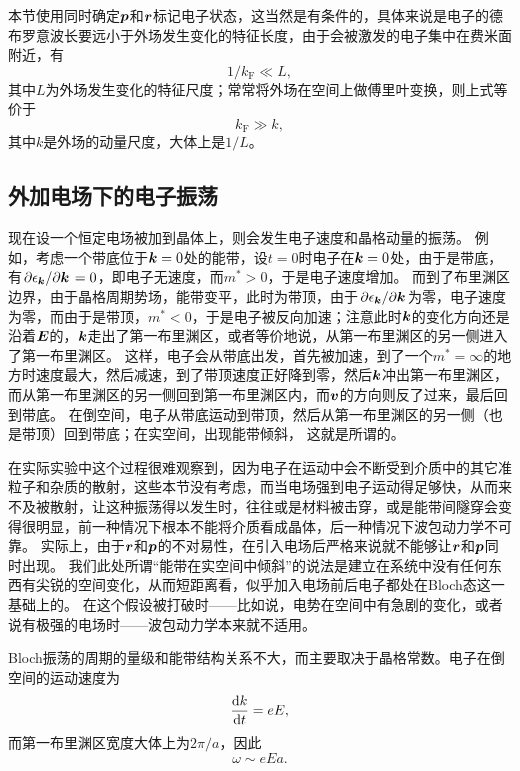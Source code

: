 本节使用同时确定$\vb*{p}$和$\vb*{r}$标记电子状态，这当然是有条件的，具体来说是电子的德布罗意波长要远小于外场发生变化的特征长度，由于会被激发的电子集中在费米面附近，有
\begin{equation}
    1 / k_\text{F} \ll L,
\end{equation}
其中$L$为外场发生变化的特征尺度；常常将外场在空间上做傅里叶变换，则上式等价于
\begin{equation}
    k_\text{F} \gg k,
\end{equation}
其中$k$是外场的动量尺度，大体上是$1/L$。

\subsection{外加电场下的电子振荡}

现在设一个恒定电场被加到晶体上，则会发生电子速度和晶格动量的振荡。
例如，考虑一个带底位于$\vb*{k}=0$处的能带，设$t=0$时电子在$\vb*{k}=0$处，由于是带底，有$\pdv*{\epsilon_{\vb*{k}}}{\vb*{k}} = 0$，即电子无速度，而$m^* > 0$，于是电子速度增加。
而到了布里渊区边界，由于晶格周期势场，能带变平，此时为带顶，由于$\pdv*{\epsilon_{\vb*{k}}}{\vb*{k}}$为零，电子速度为零，而由于是带顶，$m^* < 0$，于是电子被反向加速；注意此时$\vb*{k}$的变化方向还是沿着$\vb*{E}$的，$\vb*{k}$走出了第一布里渊区，或者等价地说，从第一布里渊区的另一侧进入了第一布里渊区。
这样，电子会从带底出发，首先被加速，到了一个$m^* = \infty$的地方时速度最大，然后减速，到了带顶速度正好降到零，然后$\vb*{k}$冲出第一布里渊区，而从第一布里渊区的另一侧回到第一布里渊区内，而$\vb*{v}$的方向则反了过来，最后回到带底。
在倒空间，电子从带底运动到带顶，然后从第一布里渊区的另一侧（也是带顶）回到带底；在实空间，出现能带倾斜，%
这就是所谓的。

在实际实验中这个过程很难观察到，因为电子在运动中会不断受到介质中的其它准粒子和杂质的散射，这些本节没有考虑，而当电场强到电子运动得足够快，从而来不及被散射，让这种振荡得以发生时，往往或是材料被击穿，或是能带间隧穿会变得很明显，前一种情况下根本不能将介质看成晶体，后一种情况下波包动力学不可靠。
实际上，由于$\vb*{r}$和$\vb*{p}$的不对易性，在引入电场后严格来说就不能够让$\vb*{r}$和$\vb*{p}$同时出现。
我们此处所谓“能带在实空间中倾斜”的说法是建立在系统中没有任何东西有尖锐的空间变化，从而短距离看，似乎加入电场前后电子都处在Bloch态这一基础上的。
在这个假设被打破时——比如说，电势在空间中有急剧的变化，或者说有极强的电场时——波包动力学本来就不适用。

Bloch振荡的周期的量级和能带结构关系不大，而主要取决于晶格常数。电子在倒空间的运动速度为
\[
    \dv{k}{t} = e E,
\]
而第一布里渊区宽度大体上为$2 \pi / a$，因此
\begin{equation}
    \omega \sim e E a.
\end{equation}

